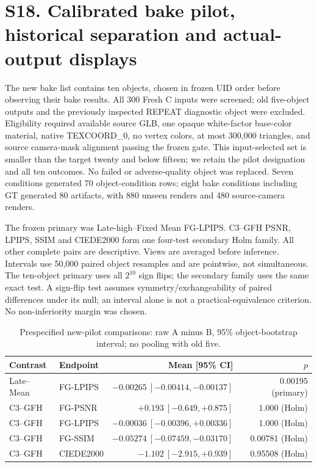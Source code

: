 \documentclass[11pt]{article}
\begin{document}
\clearpage
\section*{S18. Calibrated bake pilot, historical separation and actual-output displays}
The new bake list contains ten objects, chosen in frozen UID order before observing their bake results. All 300 Fresh C inputs were screened; old five-object outputs and the previously inspected REPEAT diagnostic object were excluded. Eligibility required available source GLB, one opaque white-factor base-color material, native TEXCOORD\_0, no vertex colors, at most 300,000 triangles, and source camera-mask alignment passing the frozen gate. This input-selected set is smaller than the target twenty and below fifteen; we retain the pilot designation and all ten outcomes. No failed or adverse-quality object was replaced. Seven conditions generated 70 object-condition rows; eight bake conditions including GT generated 80 artifacts, with 880 unseen renders and 480 source-camera renders.

The frozen primary was Late-high--Fixed Mean FG-LPIPS. C3--GFH PSNR, LPIPS, SSIM and CIEDE2000 form one four-test secondary Holm family. All other complete pairs are descriptive. Views are averaged before inference. Intervals use 50,000 paired object resamples and are pointwise, not simultaneous. The ten-object primary uses all $2^{10}$ sign flips; the secondary family uses the same exact test. A sign-flip test assumes symmetry/exchangeability of paired differences under its null; an interval alone is not a practical-equivalence criterion. No non-inferiority margin was chosen.

\begin{table}[ht]\centering\scriptsize
\caption{Prespecified new-pilot comparisons: raw A minus B, 95\% object-bootstrap interval; no pooling with old five.}\label{tab:bake-paired}
\begin{tabular}{llrr}
\toprule Contrast & Endpoint & Mean [95\% CI] & $p$ \\
\midrule
Late--Mean & FG-LPIPS & $-0.00265\ [-0.00414,-0.00137]$ & 0.00195 (primary) \\
C3--GFH & FG-PSNR & $+0.193\ [-0.649,+0.875]$ & 1.000 (Holm) \\
C3--GFH & FG-LPIPS & $-0.00036\ [-0.00396,+0.00336]$ & 1.000 (Holm) \\
C3--GFH & FG-SSIM & $-0.05274\ [-0.07459,-0.03170]$ & 0.00781 (Holm) \\
C3--GFH & CIEDE2000 & $-1.102\ [-2.915,+0.939]$ & 0.95508 (Holm) \\
\bottomrule\end{tabular}\end{table}
\end{document}

